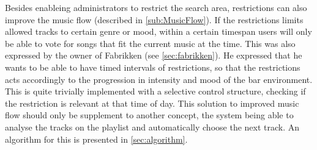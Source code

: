 Besides enableing administrators to restrict the search area, restrictions can also improve the music flow (described in \cref{sub:MusicFlow}). If the restrictions limits allowed tracks to certain genre or mood, within a certain timespan users will only be able to vote for songs that fit the current music at the time. This was also expressed by the owner of Fabrikken (see \cref{sec:fabrikken}). He expressed that he wants to be able to have timed intervals of restrictions, so that the restrictions acts accordingly to the progression in intensity and mood of the bar environment. This is quite trivially implemented with a selective control structure, checking if the restriction is relevant at that time of day. This solution to improved music flow should only be supplement to another concept, the system being able to analyse the tracks on the playlist and automatically choose the next track. An algorithm for this is presented in \cref{sec:algorithm}.